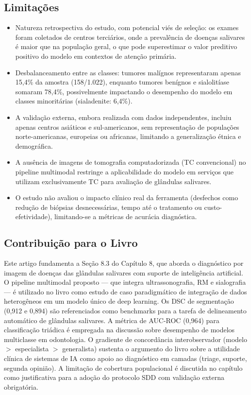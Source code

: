 \subsection{Limitações}
\begin{itemize}
  \item Natureza retrospectiva do estudo, com potencial viés de seleção:
        os exames foram coletados de centros terciários, onde a
        prevalência de doenças salivares é maior que na população geral,
        o que pode superestimar o valor preditivo positivo do modelo
        em contextos de atenção primária.
  \item Desbalanceamento entre as classes: tumores malígnos representaram
        apenas 15,4\% da amostra (158/1.022), enquanto tumores benígnos
        e sialolitíase somaram 78,4\%, possivelmente impactando o
        desempenho do modelo em classes minoritárias (sialadenite: 6,4\%).
  \item A validação externa, embora realizada com dados independentes,
        incluiu apenas centros asiáticos e sul-americanos, sem
        representação de populações norte-americanas, europeias ou
        africanas, limitando a generalização étnica e demográfica.
  \item A ausência de imagens de tomografia computadorizada (TC
        convencional) no pipeline multimodal restringe a aplicabilidade
        do modelo em serviços que utilizam exclusivamente TC para
        avaliação de glândulas salivares.
  \item O estudo não avaliou o impacto clínico real da ferramenta
        (desfechos como redução de biópsias desnecessárias, tempo
        até o tratamento ou custo-efetividade), limitando-se a métricas
        de acurácia diagnóstica.
\end{itemize}

\subsection{Contribuição para o Livro}
Este artigo fundamenta a Seção 8.3 do Capítulo 8, que aborda o
diagnóstico por imagem de doenças das glândulas salivares com suporte
de inteligência artificial. O pipeline multimodal proposto — que integra
ultrassonografia, RM e sialografia — é utilizado no livro como estudo
de caso paradigmático de integração de dados heterogêneos em um modelo
único de deep learning. Os DSC de segmentação (0,912 e 0,894) são
referenciados como benchmarks para a tarefa de delineamento automático
de glândulas salivares. A métrica de AUC-ROC (0,964) para classificação
triádica é empregada na discussão sobre desempenho de modelos
multiclasse em odontologia. O gradiente de concordância interobservador
(modelo $>$ especialista $>$ generalista) sustenta o argumento do livro
sobre a utilidade clínica de sistemas de IA como apoio ao diagnóstico
em camadas (triage, suporte, segunda opinião). A limitação de cobertura
populacional é discutida no capítulo como justificativa para a adoção
do protocolo SDD com validação externa obrigatória.

